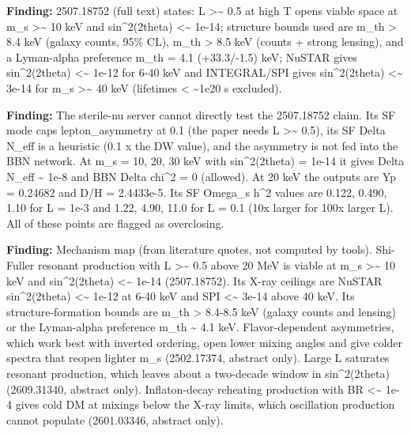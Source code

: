 \documentclass[11pt,a4paper]{article}
\begin{document}
\textbf{Finding:} 2507.18752 (full text) states: L \textgreater{}\textasciitilde{} 0.5 at high T opens viable space at m\_s \textgreater{}\textasciitilde{} 10 keV and sin\textasciicircum{}2(2theta) \textless{}\textasciitilde{} 1e-14; structure bounds used are m\_th \textgreater{} 8.4 keV (galaxy counts, 95\% CL), m\_th \textgreater{} 8.5 keV (counts + strong lensing), and a Lyman-alpha preference m\_th = 4.1 (+33.3/-1.5) keV; NuSTAR gives sin\textasciicircum{}2(2theta) \textless{}\textasciitilde{} 1e-12 for 6-40 keV and INTEGRAL/SPI gives sin\textasciicircum{}2(2theta) \textless{}\textasciitilde{} 3e-14 for m\_s \textgreater{}\textasciitilde{} 40 keV (lifetimes \textless{} \textasciitilde{}1e20 s excluded).

\textbf{Finding:} The sterile-nu server cannot directly test the 2507.18752 claim. Its SF mode caps lepton\_asymmetry at 0.1 (the paper needs L \textgreater{}\textasciitilde{} 0.5), its SF Delta N\_eff is a heuristic (0.1 x the DW value), and the asymmetry is not fed into the BBN network. At m\_s = 10, 20, 30 keV with sin\textasciicircum{}2(2theta) = 1e-14 it gives Delta N\_eff \textasciitilde{} 1e-8 and BBN Delta chi\textasciicircum{}2 = 0 (allowed). At 20 keV the outputs are Yp = 0.24682 and D/H = 2.4433e-5. Its SF Omega\_s h\textasciicircum{}2 values are 0.122, 0.490, 1.10 for L = 1e-3 and 1.22, 4.90, 11.0 for L = 0.1 (10x larger for 100x larger L). All of these points are flagged as overclosing.

\textbf{Finding:} Mechanism map (from literature quotes, not computed by tools). Shi-Fuller resonant production with L \textgreater{}\textasciitilde{} 0.5 above 20 MeV is viable at m\_s \textgreater{}\textasciitilde{} 10 keV and sin\textasciicircum{}2(2theta) \textless{}\textasciitilde{} 1e-14 (2507.18752). Its X-ray ceilings are NuSTAR sin\textasciicircum{}2(2theta) \textless{}\textasciitilde{} 1e-12 at 6-40 keV and SPI \textless{}\textasciitilde{} 3e-14 above 40 keV. Its structure-formation bounds are m\_th \textgreater{} 8.4-8.5 keV (galaxy counts and lensing) or the Lyman-alpha preference m\_th \textasciitilde{} 4.1 keV. Flavor-dependent asymmetries, which work best with inverted ordering, open lower mixing angles and give colder spectra that reopen lighter m\_s (2502.17374, abstract only). Large L saturates resonant production, which leaves about a two-decade window in sin\textasciicircum{}2(2theta) (2609.31340, abstract only). Inflaton-decay reheating production with BR \textless{}\textasciitilde{} 1e-4 gives cold DM at mixings below the X-ray limits, which oscillation production cannot populate (2601.03346, abstract only).
\end{document}
